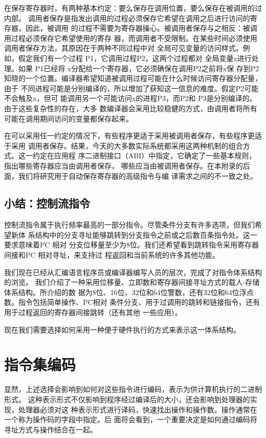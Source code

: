 在保存寄存器时，有两种基本约定：要么保存在调用位置，要么保存在被调用的过内部。
调用者保存是指发出调用的过程必须保存它希望在调用之后进行访问的寄存器，因此，被调用
的过程不需要为寄存器操心。被调用者保存与之相反：被调用过程必须保存它希望使用的寄存
器，而调用者不受限制。在某些时间必须使用调用者保存方法，其原因在于两种不同过程中对
全局可见变量的访问样式。例如，假定我们有一个过程 P1，它调用过程P2，这两个过程都对
全局变量x进行处理。如果 P1已经将 x分配给一个寄存器，它必须确保在调用P2之前将x保
存到P2知晓的一个位置。编译器希望知道被调用过程可能在什么时候访问寄存器分配量，由于
不同进程可能是分别编译的，所以增加了获知这一信息的难度。假定P2可能不会触及x，但可
能调用另一个可能访问x的进程P3，而P2和 P3是分别编译的。由于这些复杂性的存在，大多
数编译器会采用比较稳健的方式，由调用者将所有可能在调用期间访问的变量都保存起来。

在可以采用任一约定的情况下，有些程序更适于采用被调用者保存，有些程序更适于采用
调用者保存。结果，今天的大多数实际系统都采用这两种机制的组合方式。这一约定在应用程
序二进制接口（ABI）中指定，它确定了一些基本规则，指出哪些寄存器应当由调用者保存，
哪些应当由被调用者保存。在本附录的后面，我们将研究用于自动保存寄存器的高级指令与编
译需求之间的不一致之处。

\subsection{小结：控制流指令}
控制流指令属于执行频率最高的一部分指令。尽管条件分支有许多选项，但我们希望新体
系结构中的分支寻址能够跳转到分支指令之前或之后数百条指令处。这一要求意味着PC 相对
分支位移量至少为8位。我们还希望看到跳转指令采用寄存器间接和PC 相对寻址，来支持过
程返回和当前系统的许多其他功能。

我们现在已经从汇编语言程序员或编译器编写人员的层次，完成了对指令体系结构的浏览。
我们介绍了一种采用位移量、立即数和寄存器间接寻址方式的载人-存储体系结构。所介绍的数
据为8位、16位、32位和64位警数，还有32位和64位浮点数。指令包括简单操作、PC相对
条件分支、用于过调用的跳转和链接指令，还有用于过程返回的寄存器间接跳转（还有其他
一些应用）。

现在我们需要选择如何采用一种便于硬件执行的方式来表示这一体系结构。

\section{指令集编码}
显然，上述选择会影响到如何对这些指令进行编码，表示为供计算机执行的二进制形式。
这种表示形式不仅影响到程序经过编译后的大小，还会影响到处理器的实现，处理器必须对这
种表示形式进行译码，快速找出操作和操作数。操作通常在一个称为操作码的字段中指定。后
面将会看到，一个重要决定是如何通过编码将寻址方式与操作结合在一起。

